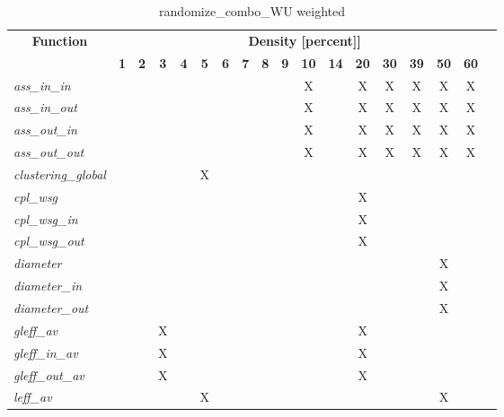 \begin{table}[h] \centering \begin{tabular}{|l|c|c|c|c|c|c|c|c|c|c|c|c|c|c|c|c|} \hline\multicolumn{1}{|c|}{\textbf{\large{Function}}} & \multicolumn{17}{c|}{\large{\textbf{Density [percent]]}}}\\\cline{2-18}  & \textbf{1} &  \textbf{2} &  \textbf{3} &  \textbf{4} &  \textbf{5} &  \textbf{6} &  \textbf{7} &  \textbf{8} &  \textbf{9} &  \textbf{10} &  \textbf{14} &  \textbf{20} &  \textbf{30} &  \textbf{39} &  \textbf{50} &  \textbf{60} \\ \hline   \textit{ass\_in\_in} &   &   &   &   &   &   &   &   &   & X &   & X & X & X & X & X \\ \hline  \textit{ass\_in\_out} &   &   &   &   &   &   &   &   &   & X &   & X & X & X & X & X \\ \hline  \textit{ass\_out\_in} &   &   &   &   &   &   &   &   &   & X &   & X & X & X & X & X \\ \hline  \textit{ass\_out\_out} &   &   &   &   &   &   &   &   &   & X &   & X & X & X & X & X \\ \hline  \textit{clustering\_global} &   &   &   &   & X &   &   &   &   &   &   &   &   &   &   &   \\ \hline  \textit{cpl\_wsg} &   &   &   &   &   &   &   &   &   &   &   & X &   &   &   &   \\ \hline  \textit{cpl\_wsg\_in} &   &   &   &   &   &   &   &   &   &   &   & X &   &   &   &   \\ \hline  \textit{cpl\_wsg\_out} &   &   &   &   &   &   &   &   &   &   &   & X &   &   &   &   \\ \hline  \textit{diameter} &   &   &   &   &   &   &   &   &   &   &   &   &   &   & X &   \\ \hline  \textit{diameter\_in} &   &   &   &   &   &   &   &   &   &   &   &   &   &   & X &   \\ \hline  \textit{diameter\_out} &   &   &   &   &   &   &   &   &   &   &   &   &   &   & X &   \\ \hline  \textit{gleff\_av} &   &   & X &   &   &   &   &   &   &   &   & X &   &   &   &   \\ \hline  \textit{gleff\_in\_av} &   &   & X &   &   &   &   &   &   &   &   & X &   &   &   &   \\ \hline  \textit{gleff\_out\_av} &   &   & X &   &   &   &   &   &   &   &   & X &   &   &   &   \\ \hline  \textit{leff\_av} &   &   &   &   & X &   &   &   &   &   &   &   &   &   & X &   \\ \hline \end{tabular}\caption{randomize\_combo\_WU weighted}\label{tab:my_label} \end{table}